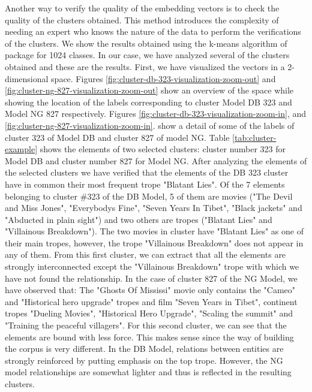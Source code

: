 \documentclass[letterpaper]{article}
\begin{document}
    
    Another way to verify the quality of the embedding vectors is to check the quality of the clusters obtained. This method introduces the complexity of needing an expert who knows the nature of the data to perform the verifications of the clusters. We show the results obtained using the k-means algorithm of \cite{git-hub-word2vec} package for 1024 classes.   In our case, we have analyzed several of the clusters obtained and these are the results. First, we have visualized the vectors in a 2-dimensional space. Figures \ref{fig:cluster-db-323-visualization-zoom-out} and \ref{fig:cluster-ng-827-visualization-zoom-out} show an overview of the space while showing the location of the labels corresponding to cluster Model DB 323 and Model NG 827 respectively. Figures \ref{fig:cluster-db-323-visualization-zoom-in}, and \ref{fig:cluster-ng-827-visualization-zoom-in}. show a detail of some of the labels of cluster 323 of Model DB and cluster 827 of model NG. Table \ref{tab:cluster-example} shows the elements of two selected clusters: cluster number 323 for Model DB and cluster number 827 for Model NG. After analyzing the elements of the selected clusters we have verified that the elements of the DB 323 cluster have in common their most frequent trope "Blatant Lies". Of the 7 elements belonging to cluster \#323 of the DB Model, 5 of them are movies ("The Devil and Miss Jones", "Everybodys Fine", "Seven Years In Tibet", "Black jackets" and "Abducted in plain sight") and two others are tropes ("Blatant Lies" and "Villainous Breakdown"). The two movies in cluster have "Blatant Lies" as one of their main tropes, however, the trope "Villainous Breakdown" does not appear in any of them. From this first cluster, we can extract that all the elements are strongly interconnected except the "Villainous Breakdown" trope with which we have not found the relationship. In the case of cluster 827 of the NG Model, we have observed that: The "Ghosts Of Mississi" movie only contains the "Cameo" and "Historical hero upgrade" tropes and film "Seven Years in Tibet", continent tropes "Dueling Movies", "Historical Hero Upgrade", "Scaling the summit" and "Training the peaceful villagers". For this second cluster, we can see that the elements are bound with less force. This makes sense since the way of building the corpus is very different. In the DB Model, relations between entities are strongly reinforced by putting emphasis on the top trope. However, the NG model relationships are somewhat lighter and thus is reflected in the resulting clusters.
    
\end{document}

